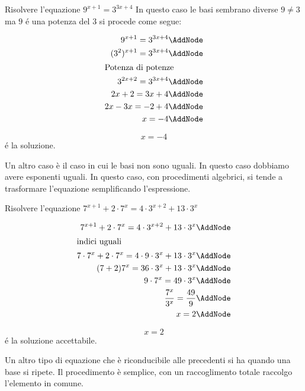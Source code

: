 \begin{esempio}
	Risolvere l'equazione $9^{x+1}=3^{3x+4}$
	In questo caso le basi sembrano diverse $9\neq 3$ ma $9$ \'{e} una potenza del $3$ si procede come segue:
	\begin{NodesList}[margin=4cm]
		\begin{align*}
			9^{x+1}=3^{3x+4}\AddNode\\
			(3^2)^{x+1}=3^{3x+4}\AddNode\\
			\intertext{\hfil Potenza di potenze}
			3^{2x+2}=3^{3x+4}\AddNode\\
			2x+2=3x+4\AddNode\\
			2x-3x=-2+4\AddNode\\
			x=-4\AddNode
		\end{align*}
		\LinkNodes{}%
	\end{NodesList}
	\[x=-4\]
	\'{e} la soluzione.
\end{esempio}
Un altro caso è il caso in cui le basi non sono uguali. In questo caso dobbiamo avere esponenti uguali. In questo caso, con procedimenti algebrici, si tende a trasformare l'equazione semplificando l'espressione. 
\begin{esempio}
	Risolvere l'equazione $7^{x+1}+2\cdot7^{x}=4\cdot3^{x+2}+13\cdot 3^x$
	\begin{NodesList} [margin=4cm]
		\begin{align*}
			7^{x+1}+2\cdot7^{x}=4\cdot3^{x+2}+13\cdot 3^x\AddNode\\
			\intertext{\hfil indici uguali}
			7\cdot7^x+2\cdot7^x=4\cdot9\cdot3^x+13\cdot3^x\AddNode\\
			(7+2)7^x=36\cdot3^x+13\cdot3^x\AddNode\\
			9\cdot7^x=49\cdot3^x\AddNode\\
			\dfrac{7^x}{3^x}=\dfrac{49}{9}\AddNode\\
			x=2\AddNode
		\end{align*}
	\end{NodesList}
	\[x=2\]
	\'{e} la soluzione accettabile.
\end{esempio}
Un altro tipo di equazione che è riconducibile alle precedenti si ha quando una base si ripete. Il procedimento è semplice, con un raccoglimento totale raccolgo l'elemento in comune. 
